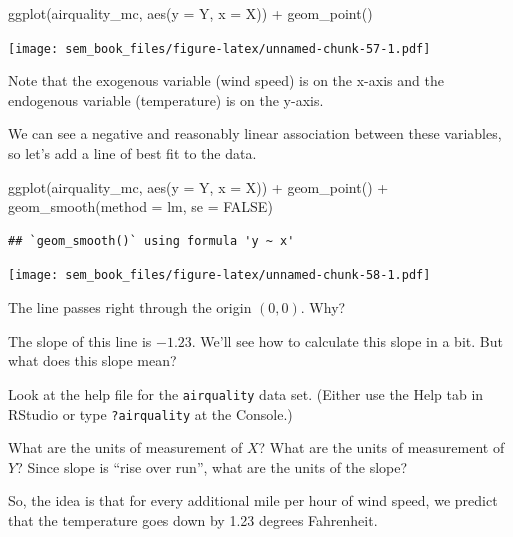 \documentclass[
]{book}
\newenvironment{Shaded}{\begin{snugshade}}{\end{snugshade}}
\newcommand{\AttributeTok}[1]{\textcolor[rgb]{0.77,0.63,0.00}{#1}}
\newcommand{\ConstantTok}[1]{\textcolor[rgb]{0.00,0.00,0.00}{#1}}
\newcommand{\FunctionTok}[1]{\textcolor[rgb]{0.00,0.00,0.00}{#1}}
\newcommand{\NormalTok}[1]{#1}
\newcommand{\SpecialCharTok}[1]{\textcolor[rgb]{0.00,0.00,0.00}{#1}}
\begin{document}
\begin{Shaded}
\begin{Highlighting}[]
\FunctionTok{ggplot}\NormalTok{(airquality\_mc, }\FunctionTok{aes}\NormalTok{(}\AttributeTok{y =}\NormalTok{ Y, }\AttributeTok{x =}\NormalTok{ X)) }\SpecialCharTok{+}
    \FunctionTok{geom\_point}\NormalTok{()}
\end{Highlighting}
\end{Shaded}

\texttt{[image: sem\_book\_files/figure-latex/unnamed-chunk-57-1.pdf]}

Note that the exogenous variable (wind speed) is on the x-axis and the endogenous variable (temperature) is on the y-axis.

We can see a negative and reasonably linear association between these variables, so let's add a line of best fit to the data.

\begin{Shaded}
\begin{Highlighting}[]
\FunctionTok{ggplot}\NormalTok{(airquality\_mc, }\FunctionTok{aes}\NormalTok{(}\AttributeTok{y =}\NormalTok{ Y, }\AttributeTok{x =}\NormalTok{ X)) }\SpecialCharTok{+}
    \FunctionTok{geom\_point}\NormalTok{() }\SpecialCharTok{+}
    \FunctionTok{geom\_smooth}\NormalTok{(}\AttributeTok{method =}\NormalTok{ lm, }\AttributeTok{se =} \ConstantTok{FALSE}\NormalTok{)}
\end{Highlighting}
\end{Shaded}

\begin{verbatim}
## `geom_smooth()` using formula 'y ~ x'
\end{verbatim}

\texttt{[image: sem\_book\_files/figure-latex/unnamed-chunk-58-1.pdf]}

The line passes right through the origin \((0, 0)\). Why?

The slope of this line is \(-1.23\). We'll see how to calculate this slope in a bit. But what does this slope mean?

Look at the help file for the \texttt{airquality} data set. (Either use the Help tab in RStudio or type \texttt{?airquality} at the Console.)

What are the units of measurement of \(X\)? What are the units of measurement of \(Y\)? Since slope is ``rise over run'', what are the units of the slope?

So, the idea is that for every additional mile per hour of wind speed, we predict that the temperature goes down by 1.23 degrees Fahrenheit.
\end{document}
